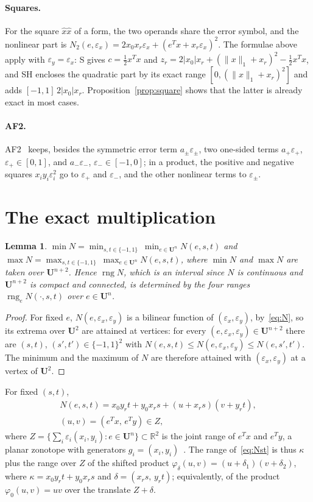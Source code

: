 \documentclass[10pt]{article}
\newtheorem{lemma}{Lemma}
\theoremstyle{definition}
\newcommand{\U}{\mathbf{U}}
\newcommand{\R}{\mathbb{R}}
\newcommand{\eps}{\varepsilon}
\newcommand{\ex}{\eps_x}
\newcommand{\ey}{\eps_y}
\newcommand{\rng}{\operatorname{rng}}
\begin{document}
\paragraph{Squares.} For the square $\hat x\hat x$ of a form, the two operands share the error symbol, and the nonlinear part is $N_2(e,\ex)=2x_0x_r\ex+(e^Tx+x_r\ex)^2$. The formulae above apply with $\ey=\ex$: S gives $c=\tfrac12x^Tx$ and $z_r=2|x_0|x_r+(\|x\|_1+x_r)^2-\tfrac12x^Tx$, and SH encloses the quadratic part by its exact range $[0,(\|x\|_1+x_r)^2]$ and adds $[-1,1]\,2|x_0|x_r$. Proposition~\ref{prop:square} shows that the latter is already exact in most cases.

\paragraph{AF2.} AF2~\cite{messine2002extentions} keeps, besides the symmetric error term $a_\pm\eps_\pm$, two one-sided terms $a_+\eps_+$, $\eps_+\in[0,1]$, and $a_-\eps_-$, $\eps_-\in[-1,0]$; in a product, the positive and negative squares $x_iy_i\eps_i^2$ go to $\eps_+$ and $\eps_-$, and the other nonlinear terms to $\eps_\pm$.

\section{The exact multiplication}
\label{sec:exact}

\begin{lemma}
\label{lem:vertices}
$\min N = \min_{s,t\in\{-1,1\}}\ \min_{e\in\U^n} N(e,s,t)$ and $\max N = \max_{s,t\in\{-1,1\}}\ \max_{e\in\U^n} N(e,s,t)$, where $\min N$ and $\max N$ are taken over $\U^{n+2}$. Hence $\rng N$, which is an interval since $N$ is continuous and $\U^{n+2}$ is compact and connected, is determined by the four ranges $\rng_e N(\cdot,s,t)$ over $e\in\U^n$.
\end{lemma}
\begin{proof}
For fixed $e$, $N(e,\ex,\ey)$ is a bilinear function of $(\ex,\ey)$, by~\eqref{eq:N}, so its extrema over $\U^2$ are attained at vertices: for every $(e,\ex,\ey)\in\U^{n+2}$ there are $(s,t)$, $(s',t')\in\{-1,1\}^2$ with $N(e,s,t)\le N(e,\ex,\ey)\le N(e,s',t')$. The minimum and the maximum of $N$ are therefore attained with $(\ex,\ey)$ at a vertex of $\U^2$.
\end{proof}

For fixed $(s,t)$,
\begin{equation}
\label{eq:Nst}
\begin{gathered}N(e,s,t) = x_0y_rt+y_0x_rs + (u + x_rs)(v + y_rt),\\ (u,v)=(e^Tx,\,e^Ty)\in Z,\end{gathered}
\end{equation}
where $Z=\{\sum_i\eps_i(x_i,y_i): e\in\U^n\}\subset\R^2$ is the joint range of $e^Tx$ and $e^Ty$, a planar zonotope with generators $g_i=(x_i,y_i)$~\cite{ziegler1995lectures}. The range of~\eqref{eq:Nst} is thus $\kappa$ plus the range over $Z$ of the shifted product $\varphi_\delta(u,v)=(u+\delta_1)(v+\delta_2)$, where $\kappa=x_0y_rt+y_0x_rs$ and $\delta=(x_rs,\,y_rt)$; equivalently, of the product $\varphi_0(u,v)=uv$ over the translate $Z+\delta$.
\end{document}

